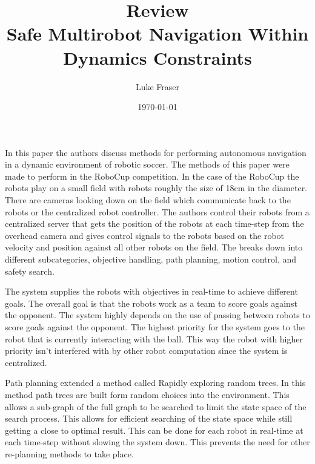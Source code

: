 \documentclass{article}
\begin{document}
\title{{\large Review} \\ Safe Multirobot Navigation Within Dynamics Constraints}
\author{Luke Fraser}
\date{\today}
\maketitle

\begingroup
\renewcommand{\section}[2]{}


\endgroup

\section*{Summary}
In this paper the authors discuss methods for performing autonomous navigation in a dynamic environment of robotic soccer. The methods of this paper were made to perform in the RoboCup competition. In the case of the RoboCup the robots play on a small field with robots roughly the size of 18cm in the diameter. There are cameras looking down on the field which communicate back to the robots or the centralized robot controller. The authors control their robots from a centralized server that gets the position of the robots at each time-step from the overhead camera and gives control signals to the robots based on the robot velocity and position against all other robots on the field. The breaks down into different subcategories, objective handling, path planning, motion control, and safety search.

The system supplies the robots with objectives in real-time to achieve different goals. The overall goal is that the robots work as a team to score goals against the opponent. The system highly depends on the use of passing between robots to score goals against the opponent. The highest priority for the system goes to the robot that is currently interacting with the ball. This way the robot with higher priority isn't interfered with by other robot computation since the system is centralized.

Path planning extended a method called Rapidly exploring random trees. In this method path trees are built form random choices into the environment. This allows a sub-graph of the full graph to be searched to limit the state space of the search process.  This allows for efficient searching of the state space while still getting a close to optimal result. This can be done for each robot in real-time at each time-step without slowing the system down. This prevents the need for other re-planning methods to take place.
\end{document}
